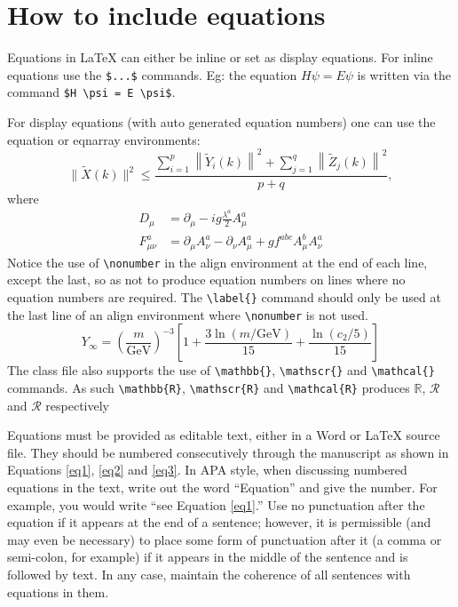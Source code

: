 \section{How to include equations}\label{sec4}

Equations in \LaTeX{} can either be inline or set as display equations. For
inline equations use the \verb+$...$+ commands. Eg: the equation
$H\psi = E \psi$ is written via the command \verb+$H \psi = E \psi$+.

For display equations (with auto generated equation numbers)
one can use the equation or eqnarray environments:
\begin{equation}
\|\tilde{X}(k)\|^2 \leq\frac{\sum\limits_{i=1}^{p}\left\|\tilde{Y}_i(k)\right\|^2+\sum\limits_{j=1}^{q}\left\|\tilde{Z}_j(k)\right\|^2 }{p+q},
\label{eq1}
\end{equation}
where
\begin{align}
D_\mu &=  \partial_\mu - ig \frac{\lambda^a}{2} A^a_\mu \nonumber \\
F^a_{\mu\nu} &= \partial_\mu A^a_\nu - \partial_\nu A^a_\mu + g f^{abc} A^b_\mu A^a_\nu
\label{eq2}
\end{align}
Notice the use of \verb+\nonumber+ in the align environment at the end
of each line, except the last, so as not to produce equation numbers on
lines where no equation numbers are required. The \verb+\label{}+ command
should only be used at the last line of an align environment where
\verb+\nonumber+ is not used.
\begin{equation}
Y_\infty = \left( \frac{m}{\textrm{GeV}} \right)^{-3}
    \left[ 1 + \frac{3 \ln(m/\textrm{GeV})}{15}
    + \frac{\ln(c_2/5)}{15} \right]
\label{eq3}
\end{equation}
The class file also supports the use of \verb+\mathbb{}+, \verb+\mathscr{}+ and
\verb+\mathcal{}+ commands. As such \verb+\mathbb{R}+, \verb+\mathscr{R}+
and \verb+\mathcal{R}+ produces $\mathbb{R}$, $\mathscr{R}$ and $\mathcal{R}$
respectively 

Equations must be provided as editable text, either in a Word or LaTeX source file. They should be numbered consecutively through the manuscript as shown in Equations \ref{eq1}, \ref{eq2} and \ref{eq3}. In APA style, when discussing numbered equations in the text, write out the word “Equation” and give the number. For example, you would write “see Equation \ref{eq1}.”
Use no punctuation after the equation if it appears at the end of a sentence; however, it is permissible (and may even be necessary) to place some form of punctuation after it (a comma or semi-colon, for example) if it appears in the middle of the sentence and is followed by text. In any case, maintain the coherence of all sentences with equations in them.


